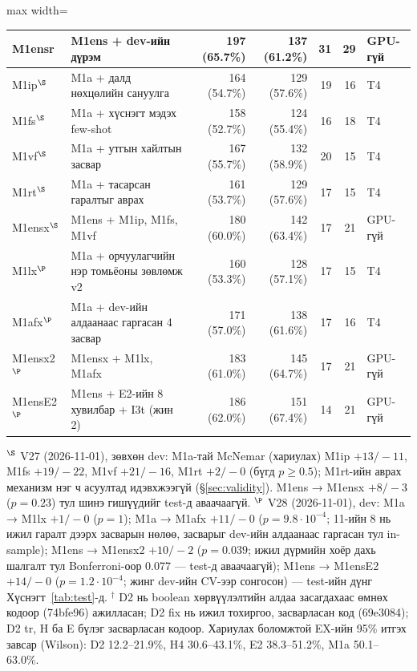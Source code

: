 \begin{table}[H]
\begin{adjustbox}{max width=\textwidth}
\begin{tabular}{llrrrrl}
M1ensr & M1ens + dev-ийн дүрэм & \textbf{197 (65.7\%)} & \textbf{137 (61.2\%)} & 31 & 29 & GPU-гүй \\
\midrule
M1ip$^\S$ & M1a + далд нөхцөлийн сануулга & 164 (54.7\%) & 129 (57.6\%) & 19 & 16 & T4 \\
M1fs$^\S$ & M1a + хүснэгт мэдэх few-shot & 158 (52.7\%) & 124 (55.4\%) & 16 & 18 & T4 \\
M1vf$^\S$ & M1a + утгын хайлтын засвар & 167 (55.7\%) & 132 (58.9\%) & 20 & 15 & T4 \\
M1rt$^\S$ & M1a + тасарсан гаралтыг аврах & 161 (53.7\%) & 129 (57.6\%) & 17 & 15 & T4 \\
M1ensx$^\S$ & M1ens + M1ip, M1fs, M1vf & 180 (60.0\%) & 142 (63.4\%) & 17 & 21 & GPU-гүй \\
\midrule
M1lx$^\P$ & M1a + орчуулагчийн нэр томьёоны зөвлөмж v2 & 160 (53.3\%) & 128 (57.1\%) & 17 & 15 & T4 \\
M1afx$^\P$ & M1a + dev-ийн алдаанаас гаргасан 4 засвар & 171 (57.0\%) & 138 (61.6\%) & 17 & 16 & T4 \\
M1ensx2$^\P$ & M1ensx + M1lx, M1afx & 183 (61.0\%) & 145 (64.7\%) & 17 & 21 & GPU-гүй \\
M1ensE2$^\P$ & M1ens + E2-ийн 8 хувилбар + I3t (жин 2) & 186 (62.0\%) & 151 (67.4\%) & 14 & 21 & GPU-гүй \\
\bottomrule
\end{tabular}
\end{adjustbox}
\par\smallskip\footnotesize $^\S$ V27 (2026-11-01), зөвхөн dev: M1a-тай McNemar (хариулах) M1ip $+13/-11$, M1fs $+19/-22$,
M1vf $+21/-16$, M1rt $+2/-0$ (бүгд $p \ge 0.5$); M1rt-ийн аврах механизм нэг ч асуултад идэвхжээгүй (§\ref{sec:validity}).
M1ens → M1ensx $+8/-3$ ($p = 0.23$) тул шинэ гишүүдийг test-д аваачаагүй.
$^\P$ V28 (2026-11-01), dev: M1a → M1lx $+1/-0$ ($p = 1$); M1a → M1afx $+11/-0$ ($p = 9.8\cdot10^{-4}$; 11-ийн 8 нь ижил
гаралт дээрх засварын нөлөө, засварыг dev-ийн алдаанаас гаргасан тул in-sample); M1ens → M1ensx2 $+10/-2$ ($p = 0.039$; ижил
дүрмийн хоёр дахь шалгалт тул Bonferroni-оор 0.077 --- test-д аваачаагүй); M1ens → M1ensE2 $+14/-0$ ($p = 1.2\cdot10^{-4}$;
жинг dev-ийн CV-ээр сонгосон) --- test-ийн дүнг Хүснэгт~\ref{tab:test}-д.
$^\dagger$ D2 нь boolean  хөрвүүлэлтийн алдаа засагдахаас өмнөх кодоор (74bfe96)
ажилласан; D2 fix нь ижил тохиргоо, засварласан код (69e3084); D2 tr, H ба E бүлэг засварласан кодоор. Хариулах боломжтой
EX-ийн 95\% итгэх завсар (Wilson): D2 12.2--21.9\%, H4 30.6--43.1\%, E2 38.3--51.2\%, M1a 50.1--63.0\%.
\end{table}

